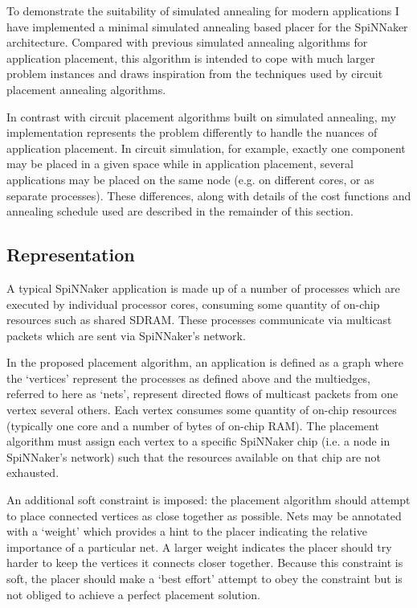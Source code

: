 		To demonstrate the suitability of simulated annealing for modern
		applications I have implemented a minimal simulated annealing based placer
		for the SpiNNaker architecture. Compared with previous simulated annealing
		algorithms for application placement, this algorithm is intended to cope
		with much larger problem instances and draws inspiration from the
		techniques used by circuit placement annealing algorithms.
		
		In contrast with circuit placement algorithms built on simulated annealing,
		my implementation represents the problem differently to handle the
		nuances of application placement. In circuit simulation, for example,
		exactly one component may be placed in a given space while in application
		placement, several applications may be placed on the same node (e.g. on
		different cores, or as separate processes). These differences, along with
		details of the cost functions and annealing schedule used are described in
		the remainder of this section.
		
		\subsection{Representation}
			
			A typical SpiNNaker application is made up of a number of processes which
			are executed by individual processor cores, consuming some quantity of
			on-chip resources such as shared SDRAM. These processes communicate via
			multicast packets which are sent via SpiNNaker's network.
			
			In the proposed placement algorithm, an application is defined as a graph
			where the `vertices' represent the processes as defined above and the
			multiedges, referred to here as `nets', represent directed flows of
			multicast packets from one vertex several others. Each vertex consumes
			some quantity of on-chip resources (typically one core and a number of
			bytes of on-chip RAM). The placement algorithm must assign each vertex to
			a specific SpiNNaker chip (i.e. a node in SpiNNaker's network) such that
			the resources available on that chip are not exhausted.
			
			
			An additional soft constraint is imposed: the placement algorithm should
			attempt to place connected vertices as close together as possible. Nets
			may be annotated with a `weight' which provides a hint to the placer
			indicating the relative importance of a particular net. A larger weight
			indicates the placer should try harder to keep the vertices it connects
			closer together. Because this constraint is soft, the placer should make
			a `best effort' attempt to obey the constraint but is not obliged to
			achieve a perfect placement solution.
			
